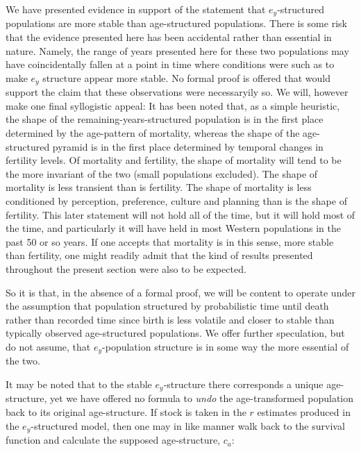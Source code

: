 We have presented evidence in support of the statement that $e_y$-structured
populations are more stable than age-structured populations. There is some
risk that the evidence presented here has been accidental rather
than essential in nature. Namely, the range of years presented here for these
two populations may have coincidentally fallen at a point in time where
conditions were such as to make $e_y$ structure appear more stable. No formal
proof is offered that would support the claim that these observations were
necessaryily so. We will, however make one final syllogistic appeal: It has been
noted that, as a simple heuristic, the shape of the remaining-years-structured
population is in the first place determined by the age-pattern of mortality,
whereas the shape of the age-structured pyramid is in the first place
determined by temporal changes in fertility levels. Of mortality and
fertility, the shape of mortality will tend to be the more invariant of the two
(small populations excluded). The shape of mortality is less transient than is
fertility. The shape of mortality is less conditioned by perception, preference, 
culture and planning than is the shape of fertility. This later statement will
not hold all of the time, but it will hold most of the time, and particularly it
will have held in most Western populations in the past 50 or so years. If one
accepts that mortality is in this sense, more stable than fertility, one might
readily admit that the kind of results presented throughout the present section
were also to be expected. 

So it is that, in the absence of a formal proof, we
will be content to operate under the assumption that population structured by 
probabilistic time until death rather than recorded time since birth is less
volatile and closer to stable than typically observed age-structured
populations. We offer further speculation, but do not assume, that $e_y$-population 
structure is in some way the more essential of the two.

It may be noted that to the stable $e_y$-structure there corresponds a unique
age-structure, yet we have offered no formula to \textit{undo} the
age-transformed population back to its original age-structure. If stock 
is taken in the $r$ estimates produced in the $e_y$-structured model, 
then one may in like manner walk back to the
survival function and calculate the supposed age-structure, $c_a$:


